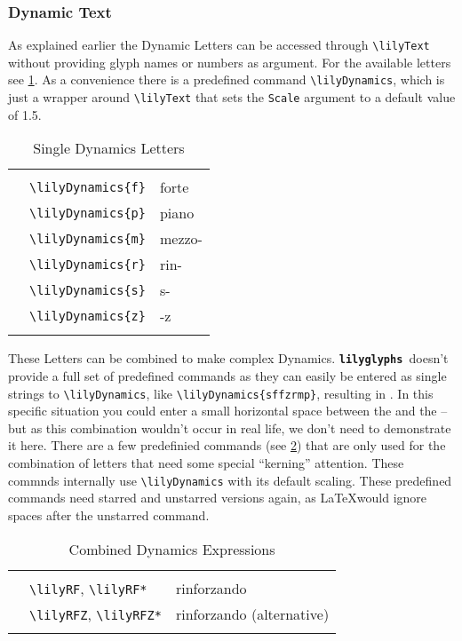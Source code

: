 \documentclass{article}
\newcommand*{\lilyglyphs}{\texttt{\textbf{lilyglyphs\,}}}
\newcommand*{\cmd}[1]{\texttt{\textbackslash #1}}
\newenvironment{reftable}[2]
	{%
		\begin{table}[ht]
			\begin{center}
				\caption{#1}
				\label{tab:#2}
				\begin{tabular}[t]{lll}
					\hline
					&\\
	}
	{%
					&\\
					\hline
				\end{tabular}
			\end{center}
		\end{table}
	}
\begin{document}
\subsubsection{Dynamic Text}
\label{subsubsec:dynamic_text}
As explained earlier the Dynamic Letters can be accessed through \cmd{lilyText} without providing glyph names or numbers as argument. 
For the available letters see \ref{tab:singleDynLetters}. 
As a convenience there is a predefined command \cmd{lilyDynamics}, which is just a wrapper around \cmd{lilyText} that sets the \texttt{Scale} argument to a default value of 1.5.

\begin{reftable}{Single Dynamics Letters}{singleDynLetters}
\lilyDynamics{f} & \cmd{lilyDynamics\{f\}} & forte\\
\lilyDynamics{p} & \cmd{lilyDynamics\{p\}} & piano\\
\lilyDynamics{m} & \cmd{lilyDynamics\{m\}} & mezzo-\\
\lilyDynamics{r} & \cmd{lilyDynamics\{r\}} & rin-\\
\lilyDynamics{s} & \cmd{lilyDynamics\{s\}} & s-\\
\lilyDynamics{z} & \cmd{lilyDynamics\{z\}} & -z\\
\end{reftable}

These Letters can be combined to make complex Dynamics. 
\lilyglyphs doesn't provide a full set of predefined commands as they can easily be entered as single strings to \cmd{lilyDynamics}, like \cmd{lilyDynamics\{sffzrmp\}}, resulting in . 
In this specific situation you could enter a small horizontal space between the  and the  -- but as this combination wouldn't occur in real life, we don't need to demonstrate it here.
There are a few predefinied commands (see \ref{tab:combinedDynLetters}) that are only used for the combination of letters that need some special \enquote{kerning} attention. These commnds internally use \cmd{lilyDynamics} with its default scaling. These predefined commands need starred and unstarred versions again, as \LaTeX would ignore spaces after the unstarred command.

\begin{reftable}{Combined Dynamics Expressions}{combinedDynLetters}
\lilyRF* & \cmd{lilyRF}, \cmd{lilyRF*} & rinforzando\\
\lilyRFZ* & \cmd{lilyRFZ}, \cmd{lilyRFZ*} & rinforzando (alternative)\\

\end{reftable}
\end{document}
